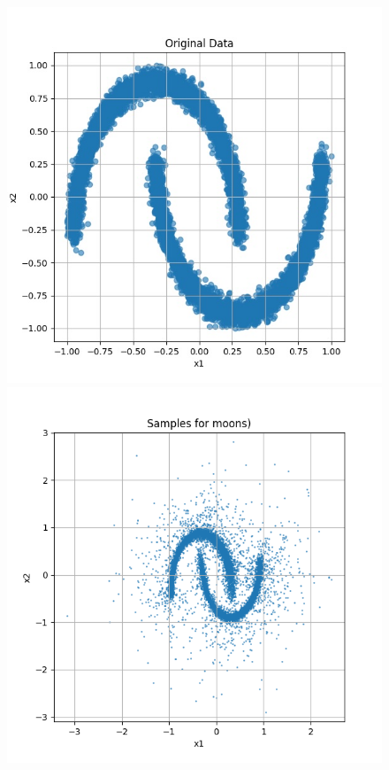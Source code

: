 \documentclass[a4paper,12pt]{article}
\begin{document}
\begin{figure}[h]
  \centering
  \begin{minipage}{0.3\textwidth}
      \centering
      \includegraphics[width=\linewidth]{images/moon.jpg}
  \end{minipage}
  \begin{minipage}{0.3\textwidth}
      \centering
      \includegraphics[width=\linewidth]{"images/Samples for ddpm_2_10_0.0001_0.02_moons.png"}

\end{minipage}
\end{figure}
\end{document}
